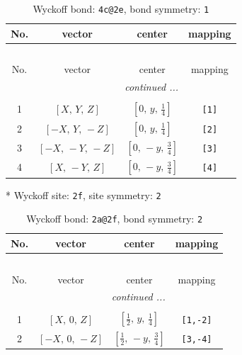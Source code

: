 \documentclass[fleqn,8pt]{jsarticle}
\begin{document}
\begin{longtable}{cccc}
\caption{Wyckoff bond: {\tt 4c@2e}, bond symmetry: {\tt 1}}
 \\
 \hline \hline
No. & vector & center & mapping \\ \hline \endfirsthead

\multicolumn{3}{l}{\tablename\ \thetable{}} \\
 \hline \hline
No. & vector & center & mapping \\ \hline \endhead

 \hline \hline
\multicolumn{3}{r}{\footnotesize\it continued ...} \\ \endfoot

 \hline \hline
\multicolumn{3}{r}{} \\ \endlastfoot

1 & $\left[ X,\, Y,\, Z \right]$ & $\left[ 0,\, y,\, \frac{1}{4} \right]$ & {\tt [1]} \\ \hline
2 & $\left[ - X,\, Y,\, - Z \right]$ & $\left[ 0,\, y,\, \frac{1}{4} \right]$ & {\tt [2]} \\ \hline
3 & $\left[ - X,\, - Y,\, - Z \right]$ & $\left[ 0,\, - y,\, \frac{3}{4} \right]$ & {\tt [3]} \\ \hline
4 & $\left[ X,\, - Y,\, Z \right]$ & $\left[ 0,\, - y,\, \frac{3}{4} \right]$ & {\tt [4]} \\
\end{longtable}
* Wyckoff site: {\tt 2f}, site symmetry: {\tt 2}
\renewcommand{\arraystretch}{1.2}
\begin{longtable}{cccc}
\caption{Wyckoff bond: {\tt 2a@2f}, bond symmetry: {\tt 2}}
 \\
 \hline \hline
No. & vector & center & mapping \\ \hline \endfirsthead

\multicolumn{3}{l}{\tablename\ \thetable{}} \\
 \hline \hline
No. & vector & center & mapping \\ \hline \endhead

 \hline \hline
\multicolumn{3}{r}{\footnotesize\it continued ...} \\ \endfoot

 \hline \hline
\multicolumn{3}{r}{} \\ \endlastfoot

1 & $\left[ X,\, 0,\, Z \right]$ & $\left[ \frac{1}{2},\, y,\, \frac{1}{4} \right]$ & {\tt [1,-2]} \\ \hline
2 & $\left[ - X,\, 0,\, - Z \right]$ & $\left[ \frac{1}{2},\, - y,\, \frac{3}{4} \right]$ & {\tt [3,-4]} \\
\end{longtable}
\end{document}
